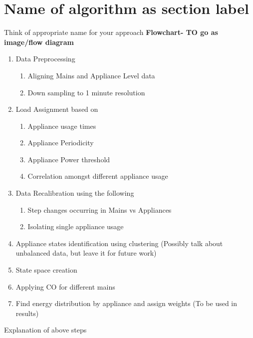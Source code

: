 \documentclass[conference]{IEEEtran}
\begin{document}
\section{Name of algorithm as section label}
Think of appropriate name for your approach
\textbf{Flowchart- TO go as image/flow diagram}
\begin{enumerate}
\item Data Preprocessing
\begin{enumerate}
\item Aligning Mains and Appliance Level data
\item Down sampling to 1 minute resolution
\end{enumerate}
\item Load Assignment based on 
\begin{enumerate}

\item Appliance usage times
\item Appliance Periodicity
\item Appliance Power threshold
\item Correlation amongst different appliance usage

\end{enumerate}
\item Data Recalibration using the following
\begin{enumerate}
\item Step changes occurring in Mains vs Appliances
\item Isolating single appliance usage
\end{enumerate}
\item Appliance states identification using clustering (Possibly talk about unbalanced data, but leave it for future work)
\item State space creation
\item Applying CO for different mains
\item Find energy distribution by appliance and assign weights (To be used in results)

\end{enumerate}


Explanation of above steps
\end{document}
